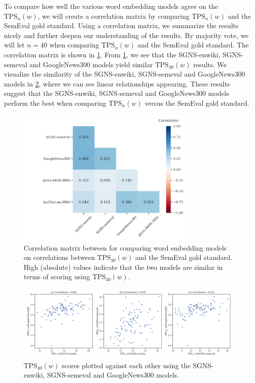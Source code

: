 To compare how well the various word embedding models agree on the $\text{TPS}_n(w)$, we will create a correlation matrix by comparing $\text{TPS}_n(w)$ and the SemEval gold standard. Using a correlation matrix, we summarize the results nicely and further deepen our understanding of the results. By majority vote, we will let $n=40$ when comparing $\text{TPS}_n(w)$ and the SemEval gold standard. The correlation matrix is shown in \cref{fig:correlation-matrix-tps-vs-gs}. From \cref{fig:correlation-matrix-tps-vs-gs}, we see that the SGNS-enwiki, SGNS-semeval and GoogleNews300 models yield similar $\text{TPS}_{40}(w)$ results. We visualize the similarity of the SGNS-enwiki, SGNS-semeval and GoogleNews300 models in \cref{fig:tps-vs-gs-top-3-correlation-word-embedding-models}, where we can see linear relationships appearing. These results suggest that the SGNS-enwiki, SGNS-semeval and GoogleNews300 models perform the best when comparing $\text{TPS}_n(w)$ versus the SemEval gold standard.
\begin{figure}[H]
    \centering
    \includegraphics[width=0.8\textwidth]{thesis/figures/correlation-matrix-tps-vs-gs.pdf}
    \caption{Correlation matrix between for comparing word embedding models on correlations between $\text{TPS}_{40}(w)$ and the SemEval gold standard. High (absolute) values indicate that the two models are similar in terms of scoring using $\text{TPS}_{40}(w)$.}
    \label{fig:correlation-matrix-tps-vs-gs}
\end{figure}
\begin{figure}[H]
    \centering
    \includegraphics[width=\textwidth]{thesis/figures/tps-vs-gs-top-3-correlation-word-embedding-models.pdf}
    \caption{$\text{TPS}_{40}(w)$ scores plotted against each other using the SGNS-enwiki, SGNS-semeval and GoogleNews300 models.}
    \label{fig:tps-vs-gs-top-3-correlation-word-embedding-models}
\end{figure}

